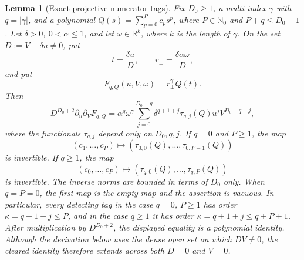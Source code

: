 \documentclass[11pt]{article}
\numberwithin{equation}{section}
\newtheorem{lemma}[theorem]{Lemma}
\theoremstyle{remark}
\theoremstyle{definition}
\newcommand{\R}{\mathbb R}
\begin{document}
\begin{lemma}[Exact projective numerator tags]\label{lem:projective-tags}
Fix \(D_0\ge1\), a multi-index \(\gamma\) with \(q=|\gamma|\), and a
polynomial \(Q(s)=\sum_{p=0}^Pc_ps^p\), where $P\in\mathbb N_0$ and
\(P+q\le D_0-1\).  Let $\delta>0$, $0<\alpha\le1$, and let
$\omega\in\R^k$, where $k$ is the length of $\gamma$.  On the set
$D:=V-\delta u\ne0$, put
\[
 t=\frac{\delta u}{D},
 \qquad r_\perp=\frac{\delta\alpha\omega}{D},
\]
and put
\[
 F_{q,Q}(u,V,\omega)=r_\perp^\gamma Q(t).
\]
Then
\begin{equation}\label{eq:exact-tag-numerator}
 D^{D_0+2}\partial_u\partial_VF_{q,Q}
 =\alpha^q\omega^\gamma
   \sum_{j=0}^{D_0-q}
   \delta^{q+1+j}\tau_{q,j}(Q)
   u^jV^{D_0-q-j},
\end{equation}
where the functionals \(\tau_{q,j}\) depend only on \(D_0,q,j\).  If
\(q=0\) and $P\ge1$, the map
\[
 (c_1,\ldots,c_P)\longmapsto
 (\tau_{0,0}(Q),\ldots,\tau_{0,P-1}(Q))
\]
is invertible.  If \(q\ge1\), the map
\[
 (c_0,\ldots,c_P)\longmapsto
 (\tau_{q,0}(Q),\ldots,\tau_{q,P}(Q))
\]
is invertible.  The inverse norms are bounded in terms of \(D_0\) only.
When $q=P=0$, the first map is the empty map and the assertion is
vacuous.
In particular, every detecting tag in the case $q=0$, $P\ge1$ has order
\(\kappa=q+1+j\le P\), and in the case $q\ge1$ it has order
\(\kappa=q+1+j\le q+P+1\).
After multiplication by $D^{D_0+2}$, the displayed equality is a
polynomial identity.  Although the derivation below uses the dense open
set on which $DV\ne0$, the cleared identity therefore extends across both
$D=0$ and $V=0$.
\end{lemma}
\end{document}
